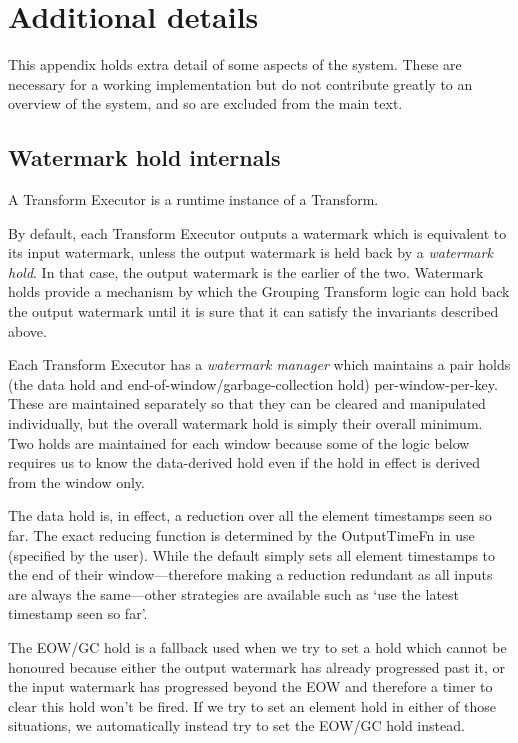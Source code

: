 \chapter{Additional details}\label{apx:aditional}

This appendix holds extra detail of some aspects of the system.
These are necessary for a working implementation but do not contribute greatly to an overview of the system, and so are excluded from the main text.

\section{Watermark hold internals}\label{apx:additional:watermark-holds}

A Transform Executor is a runtime instance of a Transform.

By default, each Transform Executor outputs a watermark which is equivalent to its input watermark, unless the output watermark is held back by a \emph{watermark hold}.
In that case, the output watermark is the earlier of the two.
Watermark holds provide a mechanism by which the Grouping Transform logic can hold back the output watermark until it is sure that it can satisfy the invariants described above.

Each Transform Executor has a \emph{watermark manager} which maintains a pair holds (the data hold and end-of-window/garbage-collection hold) per-window-per-key.
These are maintained separately so that they can be cleared and manipulated individually, but the overall watermark hold is simply their overall minimum.
Two holds are maintained for each window because some of the logic below requires us to know the data-derived hold even if the hold in effect is derived from the window only.

The data hold is, in effect, a reduction over all the element timestamps seen so far.
The exact reducing function is determined by the OutputTimeFn in use (specified by the user).
While the default simply sets all element timestamps to the end of their window---therefore making a reduction redundant as all inputs are always the same---other strategies are available such as `use the latest timestamp seen so far'.

The EOW/GC hold is a fallback used when we try to set a hold which cannot be honoured because either the output watermark has already progressed past it, or the input watermark has progressed beyond the EOW and therefore a timer to clear this hold won't be fired.
If we try to set an element hold in either of those situations, we automatically instead try to set the EOW/GC hold instead.

